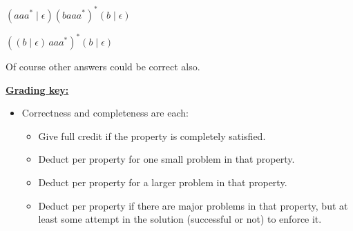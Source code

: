 \documentclass[11pt,fleqn]{article}
\begin{document}
\begin{enumerate}
\begin{centering}
            \smallskip

            \(
              ( aaa^{*} \mid \epsilon )
              ( baaa^{*} )^{*}
              ( b \mid \epsilon)
            \)

            \smallskip

            \(
              \left(
                ( b \mid \epsilon) \, aaa^{*}
              \right)^{*}
              (b \mid \epsilon)
            \)

          \end{centering}

          \medskip

          Of course other answers could be correct also.

          \medskip

          \begin{info}{\textbf{\underline{Grading key:}}}

            \smallskip

            \begin{itemize}

              \addtolength{\itemsep}{1mm}

              \item Correctness and completeness are  each:

                    \smallskip

                    \begin{itemize}

                      \addtolength{\itemsep}{.5mm}

                      \item Give full credit if the property is completely
                            satisfied.

                      \item Deduct  per property for one small
                            problem in that property.

                      \item Deduct  per property for a larger
                            problem in that property.

                      \item Deduct  per property if there are major
                            problems in that property, but at least some
                            attempt in the solution (successful or not) to
                            enforce it.


\end{itemize}
\end{itemize}
\end{info}
\end{enumerate}
\end{document}
